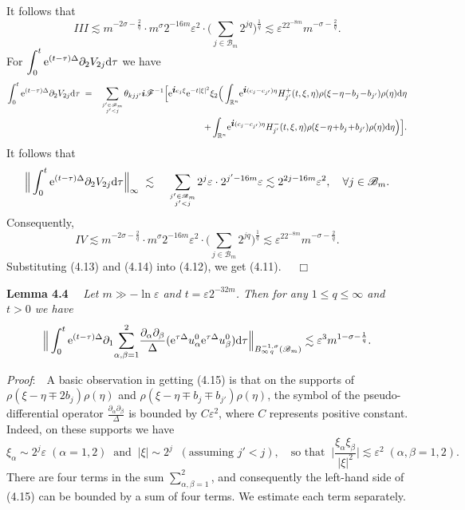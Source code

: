 \documentclass[11pt]{article}
\newcommand{\rmd}{\mbox{\rm d}}
\newcommand{\bfi}{{\mbox{\boldmath $i$}}}
\newcommand{\rme}{{\rm e}}
\begin{document}
  It follows that
\begin{equation}
  I\!\!I\!\!I\lesssim m^{-2\sigma-\frac{2}{q}}\cdot m^{\sigma}2^{-16m}\varepsilon^2\cdot\Big(\sum_{j\in\mathscr{B}_m}2^{jq}\Big)^{\frac{1}{q}}
  \lesssim \varepsilon^22^{-8m}m^{-\sigma-\frac{2}{q}}.
\end{equation}
  For $\displaystyle\int_0^t\rme^{(t-\tau)\Delta}\partial_2V_{2j}\rmd\tau$ we have
\begin{eqnarray*}
  \int_0^t\rme^{(t-\tau)\Delta}\partial_2V_{2j}\rmd\tau&\;=&\sum_{{j'\in\mathscr{B}_m\atop j'<j}}\!\theta_{kjj'}
  \bfi\mathscr{F}^{-1}\Big[\rme^{\bfi c_j\xi}\rme^{-t|\xi|^2}\xi_2\Big(\int_{\mathbb{R}^n}\!\rme^{\bfi(c_j-c_{j'})\eta}H^+_{j'}(t,\xi,\eta)
  \rho(\xi\!-\!\eta\!-\!b_j\!-\!b_{j'})\rho(\eta)\rmd\eta
\\
  &&\quad +\int_{\mathbb{R}^n}\!\rme^{\bfi(c_j-c_{j'})\eta}H^-_{j'}(t,\xi,\eta)\rho(\xi\!-\!\eta\!+\!b_j\!+\!b_{j'})\rho(\eta)\rmd\eta\Big)\Big].
\end{eqnarray*}
  It follows that
\begin{eqnarray*}
  \Big\|\int_0^t\rme^{(t-\tau)\Delta}\partial_2V_{2j}\rmd\tau\Big\|_{\infty}
  &\;\lesssim\;&\sum_{{j'\in\mathscr{B}_m\atop j'<j}}\!2^j\varepsilon\cdot 2^{j'-16m}\varepsilon
  \lesssim 2^{2j-16m}\varepsilon^2, \quad \forall j\in\mathscr{B}_m.
\end{eqnarray*}
  Consequently,
\begin{equation}
  I\!V\lesssim m^{-2\sigma-\frac{2}{q}}\cdot m^{\sigma}2^{-16m}\varepsilon^2\cdot\Big(\sum_{j\in\mathscr{B}_m}2^{jq}\Big)^{\frac{1}{q}}
  \lesssim \varepsilon^22^{-8m}m^{-\sigma-\frac{2}{q}}.
\end{equation}
  Substituting (4.13) and (4.14) into (4.12), we get (4.11). $\quad\Box$
\medskip

  {\bf Lemma 4.4} \ \ {\em Let $m\gg-\ln\varepsilon$ and $t=\varepsilon 2^{-32m}$. Then for any $1\leqslant q\leqslant\infty$ and $t>0$ we have}
\begin{equation}
  \Big\|\int_0^t\rme^{(t-\tau)\Delta}\partial_1\!\sum_{\alpha,\beta=1}^2\!\frac{\partial_{\alpha}\partial_{\beta}}{\Delta}
  (\rme^{\tau\Delta}u_{\alpha}^0\rme^{\tau\Delta}u_{\beta}^0)
  \rmd\tau\Big\|_{B^{-1,\sigma}_{\infty\,q}(\mathscr{B}_m)}\lesssim\varepsilon^3 m^{1-\sigma-\frac{1}{q}}.
\end{equation}

  {\em Proof}:\ \ A basic observation in getting (4.15) is that on the supports of $\rho(\xi-\eta\mp 2b_j)\rho(\eta)$ and
  $\rho(\xi-\eta\mp b_j\mp b_{j'})\rho(\eta)$, the symbol of the pseudo-differential operator $\displaystyle
  \frac{\partial_{\alpha}\partial_{\beta}}{\Delta}$ is bounded by $C\varepsilon^2$, where $C$ represents positive constant. Indeed, on these
  supports we have
$$
  \xi_\alpha\sim 2^j\varepsilon \; (\alpha=1,2)\;\; \mbox{and} \;\; |\xi|\sim 2^j\;\; (\mbox{assuming $j'<j$}), \quad \mbox{so that} \;\;
  \Big|\frac{\xi_{\alpha}\xi_{\beta}}{|\xi|^2}\Big|\lesssim\varepsilon^2 \; (\alpha,\beta=1,2).
$$
  There are four terms in the sum $\displaystyle\sum_{\alpha,\beta=1}^2$, and consequently the left-hand side of (4.15) can be bounded by a sum of
  four terms. We estimate each term separately.
\end{document}
